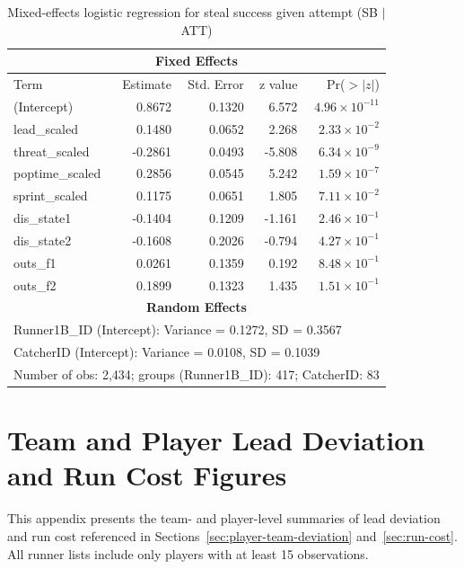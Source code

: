 \documentclass[12pt,letterpaper]{article}
\begin{document}
\begin{table}[htbp]
\centering
\caption{Mixed-effects logistic regression for steal success given attempt (SB $\mid$ ATT)}
\label{tab:sb_att}
\begin{tabular}{lrrrr}
\toprule
\multicolumn{5}{c}{\textbf{Fixed Effects}} \\
\midrule
Term & Estimate & Std. Error & z value & Pr($>|z|$) \\
\midrule
(Intercept)        &  0.8672 & 0.1320 &   6.572 & $4.96\times10^{-11}$ \\
lead\_scaled       &  0.1480 & 0.0652 &   2.268 & $2.33\times10^{-2}$ \\
threat\_scaled     & -0.2861 & 0.0493 &  -5.808 & $6.34\times10^{-9}$ \\
poptime\_scaled    &  0.2856 & 0.0545 &   5.242 & $1.59\times10^{-7}$ \\
sprint\_scaled     &  0.1175 & 0.0651 &   1.805 & $7.11\times10^{-2}$ \\
dis\_state1        & -0.1404 & 0.1209 &  -1.161 & $2.46\times10^{-1}$ \\
dis\_state2        & -0.1608 & 0.2026 &  -0.794 & $4.27\times10^{-1}$ \\
outs\_f1           &  0.0261 & 0.1359 &   0.192 & $8.48\times10^{-1}$ \\
outs\_f2           &  0.1899 & 0.1323 &   1.435 & $1.51\times10^{-1}$ \\
\midrule
\multicolumn{5}{c}{\textbf{Random Effects}} \\
\midrule
\multicolumn{5}{l}{Runner1B\_ID (Intercept): Variance = 0.1272, SD = 0.3567} \\
\multicolumn{5}{l}{CatcherID (Intercept): Variance = 0.0108, SD = 0.1039} \\
\multicolumn{5}{l}{Number of obs: 2,434; groups (Runner1B\_ID): 417; CatcherID: 83} \\
\bottomrule
\end{tabular}
\end{table}

\FloatBarrier

\section{Team and Player Lead Deviation and Run Cost Figures} \label{app:a}

This appendix presents the team- and player-level summaries of lead deviation and run cost referenced in Sections~\ref{sec:player-team-deviation} and~\ref{sec:run-cost}. All runner lists include only players with at least 15 observations.
\end{document}
